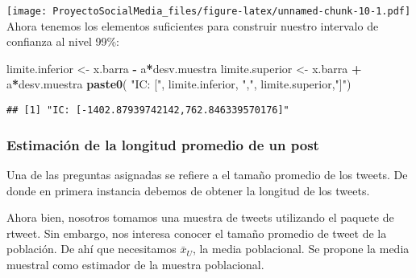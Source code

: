 \documentclass[
]{article}
\newenvironment{Shaded}{\begin{snugshade}}{\end{snugshade}}
\newcommand{\DataTypeTok}[1]{\textcolor[rgb]{0.13,0.29,0.53}{#1}}
\newcommand{\KeywordTok}[1]{\textcolor[rgb]{0.13,0.29,0.53}{\textbf{#1}}}
\newcommand{\NormalTok}[1]{#1}
\newcommand{\OperatorTok}[1]{\textcolor[rgb]{0.81,0.36,0.00}{\textbf{#1}}}
\newcommand{\OtherTok}[1]{\textcolor[rgb]{0.56,0.35,0.01}{#1}}
\newcommand{\StringTok}[1]{\textcolor[rgb]{0.31,0.60,0.02}{#1}}
\begin{document}
\texttt{[image: ProyectoSocialMedia\_files/figure-latex/unnamed-chunk-10-1.pdf]}
Ahora tenemos los elementos suficientes para construir nuestro intervalo
de confianza al nivel 99\%:

\begin{Shaded}
\begin{Highlighting}[]
\NormalTok{limite.inferior <-}\StringTok{ }\NormalTok{x.barra }\OperatorTok{-}\StringTok{ }\NormalTok{a}\OperatorTok{*}\NormalTok{desv.muestra}
\NormalTok{limite.superior <-}\StringTok{ }\NormalTok{x.barra }\OperatorTok{+}\StringTok{ }\NormalTok{a}\OperatorTok{*}\NormalTok{desv.muestra}
\KeywordTok{paste0}\NormalTok{( }\StringTok{"IC: ["}\NormalTok{,}
\NormalTok{       limite.inferior, }\StringTok{","}\NormalTok{, limite.superior,}\StringTok{"]"}\NormalTok{)}
\end{Highlighting}
\end{Shaded}

\begin{verbatim}
## [1] "IC: [-1402.87939742142,762.846339570176]"
\end{verbatim}

\hypertarget{estimaciuxf3n-de-la-longitud-promedio-de-un-post}{%
\subsubsection{Estimación de la longitud promedio de un
post}\label{estimaciuxf3n-de-la-longitud-promedio-de-un-post}}

Una de las preguntas asignadas se refiere a el tamaño promedio de los
tweets. De donde en primera instancia debemos de obtener la longitud de
los tweets.

\begin{Shaded}
\end{Shaded}

Ahora bien, nosotros tomamos una muestra de tweets utilizando el paquete
de rtweet. Sin embargo, nos interesa conocer el tamaño promedio de tweet
de la población. De ahí que necesitamos \(\bar x_U\), la media
poblacional. Se propone la media muestral como estimador de la muestra
poblacional.
\end{document}
